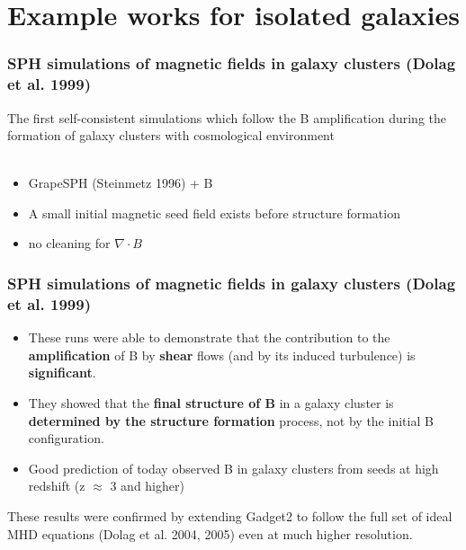 \documentclass[10pt,aspectratio=169]{beamer}
\begin{document}
\section{Example works for isolated galaxies}
\begin{frame}
	\frametitle{SPH simulations of magnetic fields in galaxy clusters (Dolag et al. 1999)}
		The first self-consistent simulations which follow the B amplification during the formation of galaxy clusters with cosmological environment
\\\
		\begin{itemize}
			\item GrapeSPH (Steinmetz 1996) + B
			\item A small initial magnetic seed field exists before structure formation
			\item no cleaning for $\nabla \cdot B$
		\end{itemize} 
\end{frame}
\begin{frame}
	\frametitle{SPH simulations of magnetic fields in galaxy clusters (Dolag et al. 1999)}
	\begin{itemize}
		\item These runs were able to demonstrate that the contribution to the \textbf{amplification} of B by \textbf{shear} flows (and by its induced turbulence) is \textbf{significant}.
		\item They showed that the \textbf{final structure of B} in a galaxy cluster is \textbf{determined by the structure formation} process, not by the initial B configuration.
		\item Good prediction of today observed B in galaxy clusters from seeds at high redshift (z $\approx$ 3 and higher)
	\end{itemize}
	These results were confirmed by extending Gadget2 to follow the full set of ideal MHD equations (Dolag et al. 2004, 2005) even at much higher resolution.
\end{frame}
\end{document}
